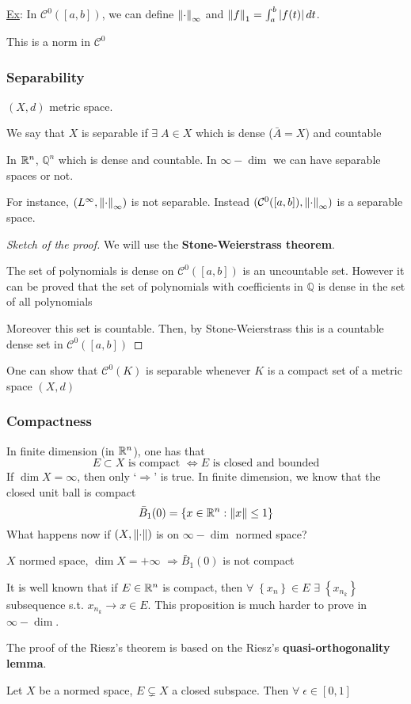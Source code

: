 \underline{Ex}: In \(\mathcal{C}^0([a,b])\), we can define \(\norm{\cdot}_{\infty}\) and \(\norm{f}_1 = \int_a^b\abs{f(t)} \, dt\).

This is a norm in \(\mathcal{C}^0\)


\subsubsection*{Separability}
\((X, d)\) metric space. 
\begin{definition}
    We say that \(X\) is separable if \(\exists \; A \in X\) which is dense (\(\bar{A} = X\)) and countable 
\end{definition}
In \(\mathbb{R}^n\), \(\mathbb{Q}^n\) which is dense and countable. In \(\infty-\dim\) we can have separable spaces or not. 

For instance, \((L^{\infty}, \norm{\cdot}_{\infty})\) is not separable. Instead \((\mathcal{C}^0([a,b]), \norm{\cdot}_{\infty})\) is a separable space. 

\begin{proof}[Sketch of the proof]We will use the \textbf{Stone-Weierstrass theorem}.

The set of polynomials is dense on \(\mathcal{C}^0([a,b])\) is an uncountable set. However it can be proved that the set of polynomials with coefficients in \(\mathbb{Q}\) is dense in the set of all polynomials

Moreover this set is countable. Then, by Stone-Weierstrass this is a countable dense set in \(\mathcal{C}^0([a,b])\)
\end{proof}
\begin{remark}
    One can show that \(\mathcal{C}^0(K)\) is separable whenever \(K\) is a compact set of a metric space \((X,d)\)
\end{remark}
\subsubsection*{Compactness}
In finite dimension (in \(\mathbb{R}^n\)), one has that
\[
    E \subset X \mbox{ is compact } \Leftrightarrow E \mbox{ is closed and bounded}
\]
If \(\dim X = \infty\), then only `\(\Rightarrow\)' is true. In finite dimension, we know that the closed unit ball is compact
\[
    \bar{B}_1(0) = \left\{ x \in \mathbb{R}^n : \norm{x} \leq 1\right\}
\]
What happens now if \((X, \norm{\cdot})\) is on \(\infty-\dim\) normed space?
\begin{theorem}
    \(X\) normed space, \(\dim X = +\infty\) \(\Rightarrow \bar{B}_1(0)\) is not compact
\end{theorem}
\begin{remark}
    It is well known that if \(E \in \mathbb{R}^n\) is compact, then \(\forall \; \left\{ x_n \right\} \in E \) \(\exists \; \left\{ x_{n_k} \right\}\) subsequence s.t. \(x_{n_k} \to x \in E\).  
    This proposition is much harder to prove in \(\infty-\dim\).
\end{remark}
The proof of the Riesz's theorem is based on the Riesz's \textbf{quasi-orthogonality lemma}.
\begin{lemma}
    Let \(X\) be a normed space, \(E \subsetneq X\) a closed subspace. Then \(\forall \; \epsilon \in [0,1]\)
\end{lemma}